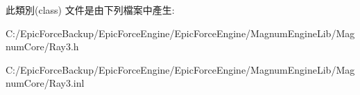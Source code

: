 此類別(class) 文件是由下列檔案中產生\+:\begin{DoxyCompactItemize}
\item 
C\+:/\+Epic\+Force\+Backup/\+Epic\+Force\+Engine/\+Epic\+Force\+Engine/\+Magnum\+Engine\+Lib/\+Magnum\+Core/Ray3.\+h\item 
C\+:/\+Epic\+Force\+Backup/\+Epic\+Force\+Engine/\+Epic\+Force\+Engine/\+Magnum\+Engine\+Lib/\+Magnum\+Core/Ray3.\+inl\end{DoxyCompactItemize}
